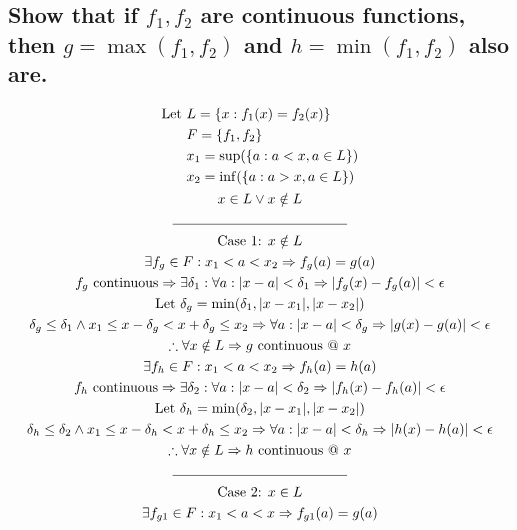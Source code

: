 \documentclass[letterpaper]{article}
\DeclarePairedDelimiter\abs{\lvert}{\rvert}
\begin{document}
\section{}
\subsection{Show that if $f_1,f_2$ are continuous functions, then $g=\max(f_1,f_2)$ and $h=\min(f_1,f_2)$ also are.}
\begin{gather*}
	\begin{aligned}
		\text{Let } &L=\{x:f_1(x)=f_2(x)\} \\
		&F=\{f_1,f_2\} \\
		&x_1=\sup(\{a:a<x,a\in L\}) \\
		&x_2=\inf(\{a:a>x,a\in L\}) \\
	\end{aligned} \\
	x\in L\lor x\notin L \\
	\line(1, 0){125} \\
	\text{Case 1: } x\notin L \\
	\exists f_g\in F:x_1<a<x_2\Rightarrow f_g(a)=g(a) \\
	f_g\text{ continuous}\Rightarrow\exists\delta_1:\forall a:\abs{x-a}<\delta_1\Rightarrow\abs{f_g(x)-f_g(a)}<\epsilon \\
	\text{Let }\delta_g=\min(\delta_1,\abs{x-x_1},\abs{x-x_2}) \\
	\delta_g\leq\delta_1\land x_1\leq x-\delta_g<x+\delta_g\leq x_2\Rightarrow\forall a:\abs{x-a}<\delta_g\Rightarrow\abs{g(x)-g(a)}<\epsilon \\
	\therefore \forall x\notin L\Rightarrow g\text{ continuous @ }x \\
	\exists f_h\in F:x_1<a<x_2\Rightarrow f_h(a)=h(a) \\
	f_h\text{ continuous}\Rightarrow\exists\delta_2:\forall a:\abs{x-a}<\delta_2\Rightarrow\abs{f_h(x)-f_h(a)}<\epsilon \\
	\text{Let }\delta_h=\min(\delta_2,\abs{x-x_1},\abs{x-x_2}) \\
	\delta_h\leq\delta_2\land x_1\leq x-\delta_h<x+\delta_h\leq x_2\Rightarrow\forall a:\abs{x-a}<\delta_h\Rightarrow\abs{h(x)-h(a)}<\epsilon \\
	\therefore \forall x\notin L\Rightarrow h\text{ continuous @ }x \\
	\line(1, 0){125} \\
	\text{Case 2: } x\in L \\
	\exists f_{g1}\in F:x_1<a<x\Rightarrow f_{g1}(a)=g(a) \\

\end{gather*}
\end{document}
